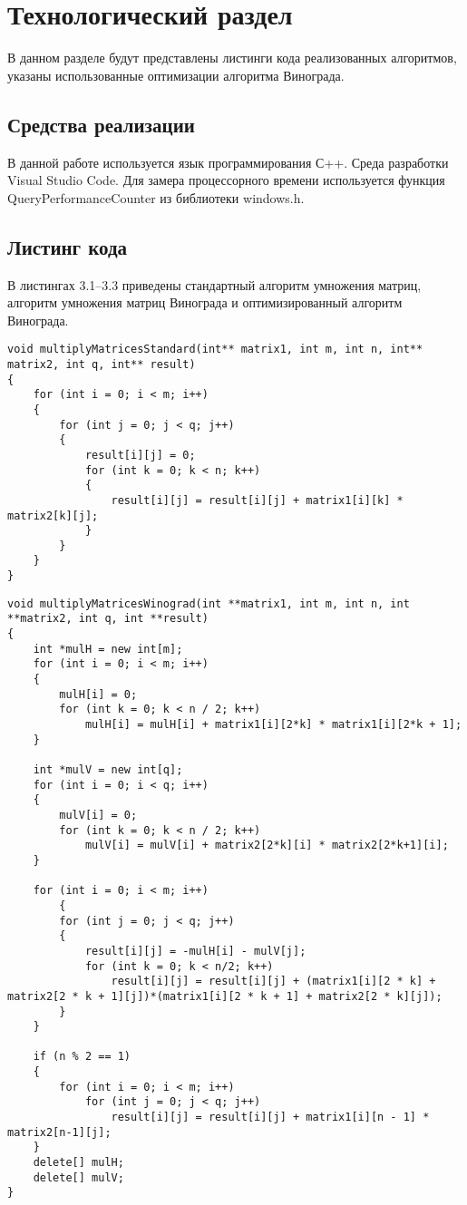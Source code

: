 \chapter{Технологический раздел}
\label{cha:impl}
В данном разделе будут представлены листинги кода реализованных алгоритмов, указаны использованные оптимизации алгоритма Винограда.
\section{Средства реализации}
В данной работе используется язык программирования С++. Среда разработки Visual Studio Code. Для замера процессорного времени используется функция QueryPerformanceCounter из библиотеки windows.h.
\section{Листинг кода}
В листингах 3.1--3.3 приведены стандартный алгоритм умножения матриц, алгоритм умножения матриц Винограда и оптимизированный алгоритм Винограда.
\begin{lstlisting}[caption= Стандартный алгоритм умножения матриц]
void multiplyMatricesStandard(int** matrix1, int m, int n, int** matrix2, int q, int** result)
{
	for (int i = 0; i < m; i++)
	{
		for (int j = 0; j < q; j++)
		{
			result[i][j] = 0;
			for (int k = 0; k < n; k++)
			{
				result[i][j] = result[i][j] + matrix1[i][k] * matrix2[k][j];
			}
		}
	}
}
\end{lstlisting}

\begin{lstlisting}[caption= Алгоритм умножения матриц Винограда]
void multiplyMatricesWinograd(int **matrix1, int m, int n, int **matrix2, int q, int **result)
{
	int *mulH = new int[m];
	for (int i = 0; i < m; i++)
	{
		mulH[i] = 0;
		for (int k = 0; k < n / 2; k++)
			mulH[i] = mulH[i] + matrix1[i][2*k] * matrix1[i][2*k + 1];
	}
	
	int *mulV = new int[q];
	for (int i = 0; i < q; i++)
	{
		mulV[i] = 0;
		for (int k = 0; k < n / 2; k++)
			mulV[i] = mulV[i] + matrix2[2*k][i] * matrix2[2*k+1][i];
	}
	
	for (int i = 0; i < m; i++)
		{
		for (int j = 0; j < q; j++)
		{
			result[i][j] = -mulH[i] - mulV[j];
			for (int k = 0; k < n/2; k++)
				result[i][j] = result[i][j] + (matrix1[i][2 * k] + matrix2[2 * k + 1][j])*(matrix1[i][2 * k + 1] + matrix2[2 * k][j]);
		}
	}
	
	if (n % 2 == 1)
	{
		for (int i = 0; i < m; i++)
			for (int j = 0; j < q; j++)
				result[i][j] = result[i][j] + matrix1[i][n - 1] * matrix2[n-1][j];
	}
	delete[] mulH;
	delete[] mulV;
}
\end{lstlisting}

